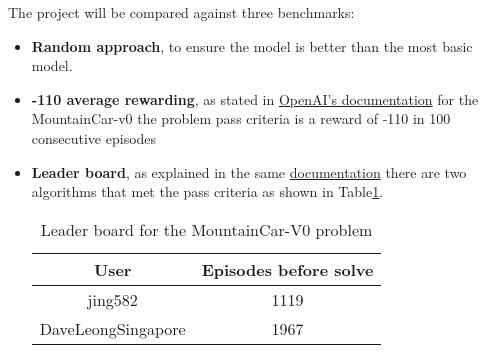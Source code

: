 The project will be compared against three benchmarks:
\begin{itemize}
\item \textbf{Random approach}, to ensure the model is better than the most basic model.
\item \textbf{-110 average rewarding}, as stated in \href{https://github.com/openai/gym/wiki/Leaderboard#mountaincar-v0}{OpenAI's documentation} for the MountainCar-v0 the problem pass criteria is a reward of -110 in 100 consecutive episodes
\item \textbf{Leader board}, as explained in the same \href{https://github.com/openai/gym/wiki/Leaderboard#mountaincar-v0}{documentation} there are two algorithms that met the pass criteria as shown in Table\ref{tab:crit}. 

\begin{table}[h]
\centering
\begin{tabular}{|c|c|}
\hline
\textbf{User}      & \textbf{Episodes before solve} \\ \hline
jing582            & 1119                           \\ \hline
DaveLeongSingapore & 1967                           \\ \hline
\end{tabular}
\caption{Leader board for the MountainCar-V0 problem}
\label{tab:crit}
\end{table}

\end{itemize}